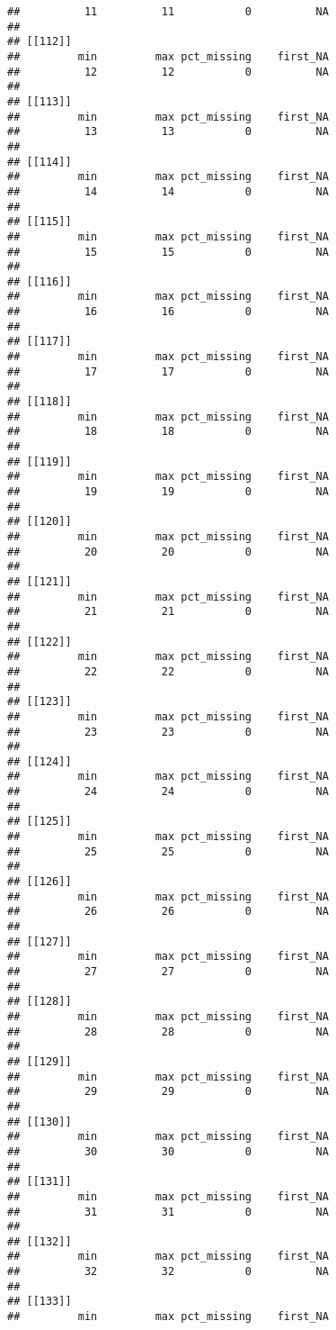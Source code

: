 \documentclass[
]{article}
\begin{document}
\begin{verbatim}
##          11          11           0          NA 
## 
## [[112]]
##         min         max pct_missing    first_NA 
##          12          12           0          NA 
## 
## [[113]]
##         min         max pct_missing    first_NA 
##          13          13           0          NA 
## 
## [[114]]
##         min         max pct_missing    first_NA 
##          14          14           0          NA 
## 
## [[115]]
##         min         max pct_missing    first_NA 
##          15          15           0          NA 
## 
## [[116]]
##         min         max pct_missing    first_NA 
##          16          16           0          NA 
## 
## [[117]]
##         min         max pct_missing    first_NA 
##          17          17           0          NA 
## 
## [[118]]
##         min         max pct_missing    first_NA 
##          18          18           0          NA 
## 
## [[119]]
##         min         max pct_missing    first_NA 
##          19          19           0          NA 
## 
## [[120]]
##         min         max pct_missing    first_NA 
##          20          20           0          NA 
## 
## [[121]]
##         min         max pct_missing    first_NA 
##          21          21           0          NA 
## 
## [[122]]
##         min         max pct_missing    first_NA 
##          22          22           0          NA 
## 
## [[123]]
##         min         max pct_missing    first_NA 
##          23          23           0          NA 
## 
## [[124]]
##         min         max pct_missing    first_NA 
##          24          24           0          NA 
## 
## [[125]]
##         min         max pct_missing    first_NA 
##          25          25           0          NA 
## 
## [[126]]
##         min         max pct_missing    first_NA 
##          26          26           0          NA 
## 
## [[127]]
##         min         max pct_missing    first_NA 
##          27          27           0          NA 
## 
## [[128]]
##         min         max pct_missing    first_NA 
##          28          28           0          NA 
## 
## [[129]]
##         min         max pct_missing    first_NA 
##          29          29           0          NA 
## 
## [[130]]
##         min         max pct_missing    first_NA 
##          30          30           0          NA 
## 
## [[131]]
##         min         max pct_missing    first_NA 
##          31          31           0          NA 
## 
## [[132]]
##         min         max pct_missing    first_NA 
##          32          32           0          NA 
## 
## [[133]]
##         min         max pct_missing    first_NA 

\end{verbatim}
\end{document}
